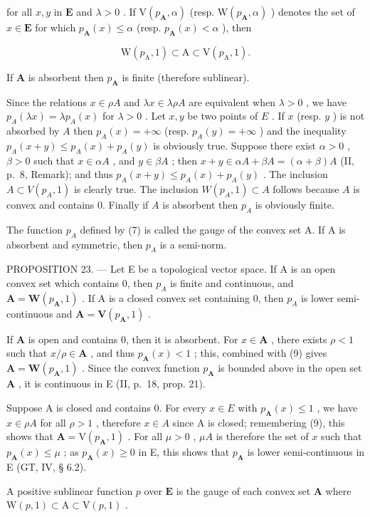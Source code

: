 for all \(x, y\) in \(\mathbf{E}\) and \(\lambda > 0\) . If \(\mathrm{V}(p_{\mathbf{A}}, \alpha)\) (resp. \(\mathrm{W}(p_{\mathbf{A}}, \alpha)\) ) denotes the set of \(x \in \mathbf{E}\) for which \(p_{\mathbf{A}}(x) \leqslant \alpha\) (resp. \(p_{\mathbf{A}}(x) < \alpha\) ), then

\[
\mathrm{W} (p _ {\mathrm{A}}, 1) \subset \mathrm{A} \subset \mathrm{V} (p _ {\mathrm{A}}, 1).\tag{9}
\]

If \(\mathbf{A}\) is absorbent then \(p_{\mathbf{A}}\) is finite (therefore sublinear).

Since the relations \(x \in \rho A\) and \(\lambda x \in \lambda \rho A\) are equivalent when \(\lambda > 0\) , we have \(p_A(\lambda x) = \lambda p_A(x)\) for \(\lambda > 0\) . Let \(x, y\) be two points of \(E\) . If \(x\) (resp. \(y\) ) is not absorbed by \(A\) then \(p_A(x) = +\infty\) (resp. \(p_A(y) = +\infty\) ) and the inequality \(p_A(x + y) \leqslant p_A(x) + p_A(y)\) is obviously true. Suppose there exist \(\alpha > 0\) , \(\beta > 0\) such that \(x \in \alpha A\) , and \(y \in \beta A\) ; then \(x + y \in \alpha A + \beta A = (\alpha + \beta)A\) (II, p.~8, Remark); and thus \(p_A(x + y) \leqslant p_A(x) + p_A(y)\) . The inclusion \(A \subset V(p_A, 1)\) is clearly true. The inclusion \(W(p_A, 1) \subset A\) follows because \(A\) is convex and contains 0. Finally if \(A\) is absorbent then \(p_A\) is obviously finite.

The function \(p_{A}\) defined by (7) is called the gauge of the convex set A. If A is absorbent and symmetric, then \(p_{A}\) is a semi-norm.

PROPOSITION 23. --- Let E be a topological vector space. If A is an open convex set which contains 0, then \(p_{A}\) is finite and continuous, and \(\mathbf{A} = \mathbf{W}(p_{\mathbf{A}}, 1)\) . If A is a closed convex set containing 0, then \(p_{A}\) is lower semi-continuous and \(\mathbf{A} = \mathbf{V}(p_{\mathbf{A}}, 1)\) .

If \(\mathbf{A}\) is open and contains 0, then it is absorbent. For \(x \in \mathbf{A}\) , there exists \(\rho < 1\) such that \(x / \rho \in \mathbf{A}\) , and thus \(p_{\mathbf{A}}(x) < 1\) ; this, combined with (9) gives \(\mathbf{A} = \mathbf{W}(p_{\mathbf{A}}, 1)\) . Since the convex function \(p_{\mathbf{A}}\) is bounded above in the open set \(\mathbf{A}\) , it is continuous in E (II, p.~18, prop. 21).

Suppose A is closed and contains 0. For every \(x \in E\) with \(p_{\mathbf{A}}(x) \leqslant 1\) , we have \(x \in \rho A\) for all \(\rho > 1\) , therefore \(x \in A\) since A is closed; remembering (9), this shows that \(\mathbf{A} = \mathrm{V}(p_{\mathbf{A}}, 1)\) . For all \(\mu > 0\) , \(\mu A\) is therefore the set of \(x\) such that \(p_{\mathbf{A}}(x) \leqslant \mu\) ; as \(p_{\mathbf{A}}(x) \geqslant 0\) in E, this shows that \(p_{\mathbf{A}}\) is lower semi-continuous in E (GT, IV, § 6.2).

A positive sublinear function \(p\) over \(\mathbf{E}\) is the gauge of each convex set \(\mathbf{A}\) where \(\mathrm{W}(p,1)\subset \mathrm{A}\subset \mathrm{V}(p,1)\) .

